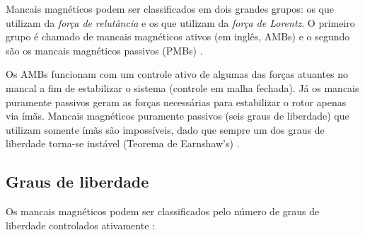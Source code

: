 Mancais magnéticos podem ser classificados em dois grandes grupos: os que utilizam da \textit{força de relutância} e os que utilizam da \textit{força de Lorentz}. O primeiro grupo é chamado de mancais magnéticos ativos (em inglês, AMBs) e o segundo são os mancais magnéticos passivos (PMBs) \citep{Schweitzer2009}.

Os AMBs funcionam com um controle ativo de algumas das forças atuantes no mancal a fim de estabilizar o sistema (controle em malha fechada). Já os mancais puramente passivos geram as forças necessárias para estabilizar o rotor apenas via ímãs.
Mancais magnéticos puramente passivos (seis graus de liberdade) que utilizam somente ímãs são impossíveis, dado que sempre um dos graus de liberdade torna-se instável (Teorema de Earnshaw's) \citep[pg. 20]{Schweitzer2009}.


\subsection{Graus de liberdade}

Os mancais magnéticos podem ser classificados pelo número de graus de liberdade controlados ativamente \citep{Schweitzer2009}:

